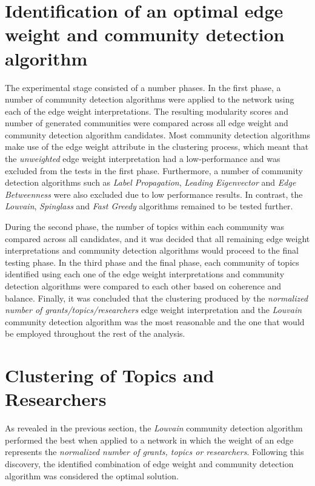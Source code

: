 \section{Identification of an optimal edge weight and community detection algorithm}

The experimental stage consisted of a number phases. In the first phase, a number of community detection algorithms were applied to the network using each of the edge weight interpretations. The resulting modularity scores and number of generated communities were compared across all edge weight and community detection algorithm candidates. Most community detection algorithms make use of the edge weight attribute in the clustering process, which meant that the \textit{unweighted} edge weight interpretation had a low-performance and was excluded from the tests in the first phase. Furthermore, a number of community detection algorithms such as \textit{Label Propagation}, \textit{Leading Eigenvector} and \textit{Edge Betweenness} were also excluded due to low performance results. In contrast, the \textit{Louvain}, \textit{Spinglass} and \textit{Fast Greedy} algorithms remained to be tested further.

During the second phase, the number of topics within each community was compared across all candidates, and it was decided that all remaining edge weight interpretations and community detection algorithms would proceed to the final testing phase. In the third phase and the final phase, each community of topics identified using each one of the edge weight interpretations and community detection algorithms were compared to each other based on coherence and balance. Finally, it was concluded that the clustering produced by the \textit{normalized number of grants/topics/researchers} edge weight interpretation and the \textit{Louvain} community detection algorithm was the most reasonable and the one that would be employed throughout the rest of the analysis.

\section{Clustering of Topics and Researchers}

As revealed in the previous section, the \textit{Louvain} community detection algorithm performed the best when applied to a network in which the weight of an edge represents the \textit{normalized number of grants, topics or researchers}. Following this discovery, the identified combination of edge weight and community detection algorithm was considered the optimal solution.

